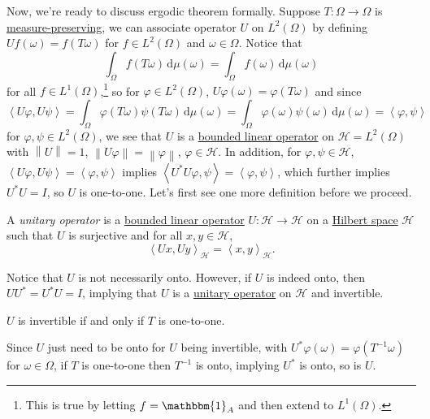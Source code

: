Now, we're ready to discuss ergodic theorem formally. Suppose \(T\colon \Omega \to \Omega\) is \hyperref[def:measure-preserving]{measure-preserving}, we can associate operator \(U\) on \(L^2(\Omega)\) by defining \(U f(\omega) = f(T \omega)\) for \(f\in L^2(\Omega )\) and \(\omega \in \Omega\). Notice that
\[
	\int_\Omega f(T \omega) \,\mathrm{d} \mu(\omega) = \int_\Omega f(\omega) \,\mathrm{d} \mu(\omega)
\]
for all \(f\in L^1(\Omega )\),\footnote{This is true by letting \(f = \mathbbm{1}_A\) and then extend to \(L^1(\Omega)\).} so for \(\varphi \in L^2(\Omega)\), \(U \varphi(\omega) = \varphi (T \omega)\) and since
\[
	\left\langle U \varphi, U \psi \right\rangle
	= \int_\Omega \varphi(T \omega) \psi(T \omega) \,\mathrm{d} \mu(\omega)
	= \int_\Omega \varphi(\omega) \psi(\omega) \,\mathrm{d} \mu(\omega)
	= \left\langle \varphi, \psi \right\rangle
\]
for \(\varphi,\psi \in L^2(\Omega)\), we see that \(U\) is a \hyperref[def:bounded-linear-op]{bounded linear operator} on \(\mathcal{H} = L^2(\Omega)\) with \(\left\lVert U\right\rVert  = 1\), \(\left\lVert U\varphi \right\rVert = \left\lVert \varphi \right\rVert\), \(\varphi \in \mathcal{H}\). In addition, for \(\varphi,\psi \in \mathcal{H}\), \(\left\langle U \varphi, U \psi \right\rangle = \left\langle \varphi, \psi \right\rangle\) implies \(\left\langle U^{\ast} U \varphi, \psi \right\rangle = \left\langle \varphi, \psi \right\rangle\), which further implies \(U^{\ast} U = I\), so \(U\) is one-to-one. Let's first see one more definition before we proceed.

\begin{definition}\label{def:unitary-op}
	A \emph{unitary operator} is a \hyperref[def:bounded-linear-op]{bounded linear operator} \(U\colon \mathcal{H} \to \mathcal{H} \) on a \hyperref[def:Hilbert-space]{Hilbert space} \(\mathcal{H} \) such that \(U\) is surjective and for all \(x, y\in \mathcal{H} \),
	\[
		\left\langle Ux, Uy \right\rangle _{\mathcal{H} } = \left\langle x, y \right\rangle _{\mathcal{H} }.
	\]
\end{definition}

Notice that \(U\) is not necessarily onto. However, if \(U\) is indeed onto, then \(UU^{\ast} = U^{\ast} U = I\), implying that \(U\) is a \hyperref[def:unitary-op]{unitary operator} on \(\mathcal{H}\) and invertible.

\begin{note}
	\(U\) is invertible if and only if \(T\) is one-to-one.
\end{note}
\begin{explanation}
	Since \(U\) just need to be onto for \(U\) being invertible, with \(U^{\ast} \varphi(\omega) = \varphi(T^{-1} \omega)\) for \(\omega \in \Omega\), if \(T\) is one-to-one then \(T^{-1} \) is onto, implying \(U^{\ast} \) is onto, so is \(U\).
\end{explanation}

